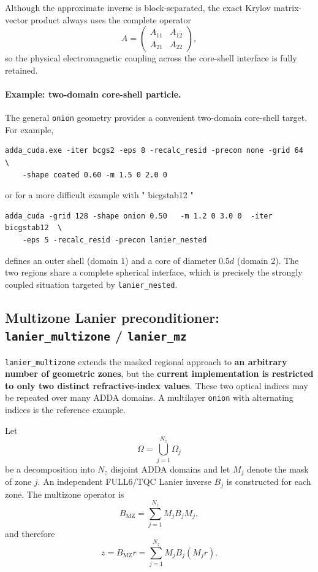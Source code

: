 \documentclass[11pt,a4paper]{article}
\begin{document}
Although the approximate inverse is block-separated, the exact Krylov matrix-vector product always uses the complete operator
\begin{equation}
A=
\begin{pmatrix}
A_{11} & A_{12}\\
A_{21} & A_{22}
\end{pmatrix},
\end{equation}
so the physical electromagnetic coupling across the core-shell interface is fully retained.

\paragraph{Example: two-domain core-shell particle.}

The general \texttt{onion} geometry provides a convenient two-domain core-shell target. For example,
\begin{verbatim}
adda_cuda.exe -iter bcgs2 -eps 8 -recalc_resid -precon none -grid 64  \
	-shape coated 0.60 -m 1.5 0 2.0 0
\end{verbatim}
or for a more difficult example  with " bicgstab12 "
\begin{verbatim}
adda_cuda -grid 128 -shape onion 0.50   -m 1.2 0 3.0 0  -iter bicgstab12  \
	-eps 5 -recalc_resid -precon lanier_nested
\end{verbatim}

defines an outer shell (domain 1) and a core of diameter \(0.5d\) (domain 2). The two regions share a complete spherical interface, which is precisely the strongly coupled situation targeted by \texttt{lanier\_nested}.

\subsection{Multizone Lanier preconditioner: \texttt{lanier\_multizone} / \texttt{lanier\_mz}}

\texttt{lanier\_multizone} extends the masked regional approach to \textbf{an arbitrary number of geometric zones}, but the \textbf{current implementation is restricted to only two distinct refractive-index values}. These two optical indices may be repeated over many ADDA domains. A multilayer \texttt{onion} with alternating indices is the reference example.

Let
\begin{equation}
\Omega=\bigcup_{j=1}^{N_z}\Omega_j
\end{equation}
be a decomposition into \(N_z\) disjoint ADDA domains and let \(M_j\) denote the mask of zone \(j\). An independent FULL6/TQC Lanier inverse \(B_j\) is constructed for each zone. The multizone operator is
\begin{equation}
B_{\mathrm{MZ}}
=
\sum_{j=1}^{N_z}M_jB_jM_j,
\end{equation}
and therefore
\begin{equation}
z=B_{\mathrm{MZ}}r
=
\sum_{j=1}^{N_z}M_jB_j(M_jr).
\end{equation}
\end{document}
